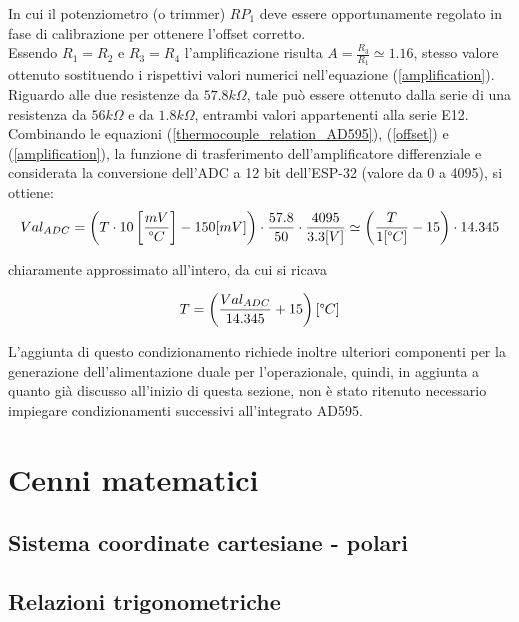 \documentclass[12pt]{article}
\begin{document}
        \noindent
        In cui il potenziometro (o trimmer) $RP_1$ deve essere opportunamente regolato in fase di calibrazione per ottenere l'offset corretto.\\
        Essendo $R_1=R_2$ e $R_3=R_4$ l'amplificazione risulta $A = \frac{R_3}{R_1} \simeq 1.16$, stesso valore ottenuto sostituendo i rispettivi valori numerici nell'equazione (\ref{amplification}). Riguardo alle due resistenze da $57.8 k\Omega$, tale può essere ottenuto dalla serie di una resistenza da $56 k\Omega$ e da $1.8 k\Omega$, entrambi valori appartenenti alla serie E12.\\
        Combinando le equazioni (\ref{thermocouple_relation_AD595}), (\ref{offset}) e (\ref{amplification}), la funzione di trasferimento dell'amplificatore differenziale e considerata la conversione dell'ADC a 12 bit dell'ESP-32 (valore da 0 a 4095), si ottiene:
        \begin{equation}
            Val_{ADC} = \left( T \cdot 10 \left[ \frac{mV}{\degree C} \right] - 150 [mV] \right) \cdot \frac{57.8}{50} \cdot \frac{4095}{3.3[V]} \simeq \left( \frac{T}{1 [\degree C]} - 15 \right) \cdot  14.345
        \end{equation}
        
        \noindent
        chiaramente approssimato all'intero, da cui si ricava
        
        \begin{equation}
            T = \left( \frac{Val_{ADC}}{14.345} + 15 \right) [\degree C]
        \end{equation}
    
        \noindent
        L'aggiunta di questo condizionamento richiede inoltre ulteriori componenti per la generazione dell'alimentazione duale per l'operazionale, quindi, in aggiunta a quanto già discusso all'inizio di questa sezione, non è stato ritenuto necessario impiegare condizionamenti successivi all'integrato AD595.
\vspace{1cm}

\section{Cenni matematici}
    \subsection{Sistema coordinate cartesiane - polari}
    \subsection{Relazioni trigonometriche}
\end{document}
